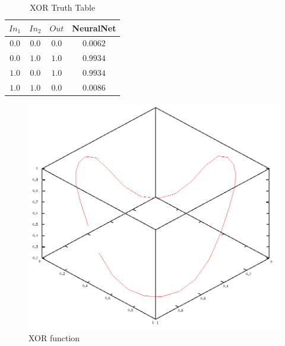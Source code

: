 \documentclass{article}
\begin{document}
\begin{table}[ht]
	\caption{XOR Truth Table}
	\label{tab:xortable}
	\begin{center}
		\begin{tabular}{cc|cc}
		\hline
		\hline
		\textbf{$In_1$} & \textbf{$In_2$} & \textbf{$Out$} & NeuralNet \\
		\hline
			$0.0$ & $0.0$ & $0.0$ & $0.0062$\\
			$0.0$ & $1.0$ & $1.0$ & $0.9934$\\
			$1.0$ & $0.0$ & $1.0$ & $0.9934$\\
			$1.0$ & $1.0$ & $0.0$ & $0.0086$\\
		\hline

		\hline
		\end{tabular}
	\end{center}
\end{table}

\begin{figure}[tb]
	\begin{center}
		\includegraphics[scale=0.5]{img/xor1}
	\end{center}
	\caption{XOR function}
	\label{fig:xor1}
\end{figure}
\end{document}

